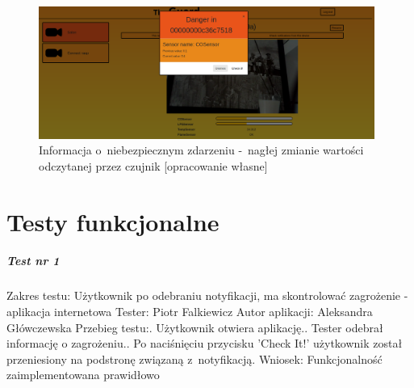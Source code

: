 \documentclass[polish,bachelor,a4paper,oneside]{ppfcmthesis}
\begin{document}
    \begin{figure}[H]
        \centering
        \captionsetup{justification=centering, margin=1cm}
        \includegraphics[width=11cm]{web_screenshots/danger.png}
        \caption{Informacja o~niebezpiecznym zdarzeniu -~nagłej zmianie wartości odczytanej przez czujnik [opracowanie własne]}
        \label{web_notification}
    \end{figure}

    \chapter{Testy funkcjonalne}

    \paragraph{Test nr 1}
    Zakres testu:\newline
    Użytkownik po odebraniu notyfikacji, ma skontrolować zagrożenie - aplikacja internetowa\newline
    Tester: Piotr Falkiewicz\newline
    Autor aplikacji: Aleksandra Główczewska\newline
    Przebieg testu:. Użytkownik otwiera aplikację.. Tester odebrał informację o zagrożeniu.. Po naciśnięciu przycisku 'Check It!' użytkownik został przeniesiony na podstronę związaną z~notyfikacją.\newline
    Wniosek:\newline
    Funkcjonalność zaimplementowana prawidłowo\newline
    \newline
\end{document}
